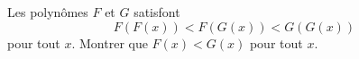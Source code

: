 Les polynômes $F$ et $G$ satisfont
$$F(F(x)) < F(G(x)) < G(G(x))$$
pour tout $x$. Montrer que $F(x) < G(x)$ pour tout $x$.